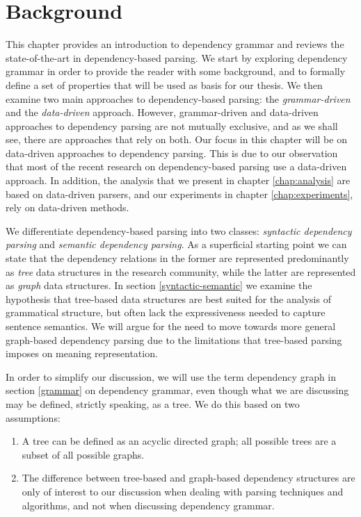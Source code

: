 \chapter{Background}
\label{chap:background}

This chapter provides an introduction to dependency grammar and reviews the state-of-the-art in dependency-based parsing. We start by exploring dependency grammar in order to provide the reader with some background, and to formally define a set of properties that will be used as basis for our thesis. We then examine two main approaches to dependency-based parsing: the \textit{grammar-driven} and the \textit{data-driven} approach. However, grammar-driven and data-driven approaches to dependency parsing are not mutually exclusive, and as we shall see, there are approaches that rely on both. Our focus in this chapter will be on data-driven approaches to dependency parsing. This is due to our observation that most of the recent research on dependency-based parsing use a data-driven approach. In addition, the analysis that we present in chapter \ref{chap:analysis} are based on data-driven parsers, and our experiments in chapter \ref{chap:experiments}, rely on data-driven methods.

We differentiate dependency-based parsing into two classes: \textit{syntactic dependency parsing} and \textit{semantic dependency parsing}. As a superficial starting point we can state that the dependency relations in the former are represented predominantly as \textit{tree} data structures in the research community, while the latter are represented as \textit{graph} data structures. In section \ref{syntactic-semantic} we examine the hypothesis that tree-based data structures are best suited for the analysis of grammatical structure, but often lack the expressiveness needed to capture sentence semantics. We will argue for the need to move towards more general graph-based dependency parsing due to the limitations that tree-based parsing imposes on meaning representation.

In order to simplify our discussion, we will use the term dependency graph in section \ref{grammar} on dependency grammar, even though what we are discussing may be defined, strictly speaking, as a tree. We do this based on two assumptions:

\begin{enumerate}
\item A tree can be defined as an acyclic directed graph; all possible trees are a subset of all possible graphs.
\item The difference between tree-based and graph-based dependency structures are only of interest to our discussion when dealing with parsing techniques and algorithms, and not when discussing dependency grammar.
\end{enumerate}

